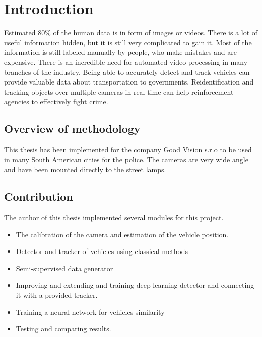 \documentclass[a4paper,12pt,titlepage, twoside]{article}
\numberwithin{figure}{section}
\begin{document}

\section{Introduction}
Estimated 80\% of the human data is in form of images or videos. There is a lot of useful information hidden, but it is still very complicated to gain it. Most of the information is still labeled manually by people, who make mistakes and are expensive. There is an incredible need for automated video processing in many branches of the industry. Being able to accurately detect and track vehicles can provide valuable data about transportation to governments. Reidentification and tracking objects over multiple cameras in real time can help reinforcement agencies to effectively fight crime. 

\subsection{Overview of methodology}
This thesis has been implemented for the company Good Vision s.r.o to be used in many South American cities for the police. The cameras are very wide angle and have been mounted directly to the street lamps.


\subsection{Contribution}
The author of this thesis implemented several modules for this project.

\begin{itemize}
\item The calibration of the camera and estimation of the vehicle position.

\item Detector and tracker of vehicles using classical methods

\item Semi-supervised data generator

\item Improving and extending and training deep learning detector and connecting it with a provided tracker.

\item Training a neural network for vehicles similarity

\item Testing and comparing results.


\end{itemize}
\end{document}
